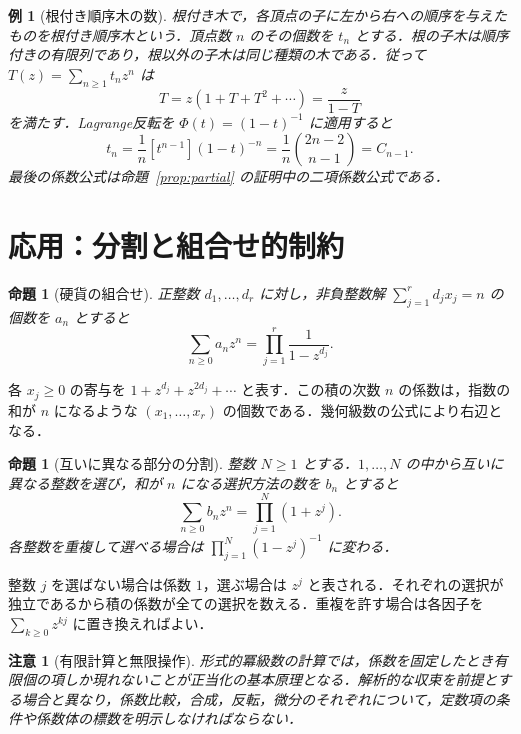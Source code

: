 \documentclass[a5paper,10pt,onecolumn]{jsarticle}
\makeatletter
\theoremstyle{mathnotetheorem}
\newtheorem{proposition}[theorem]{命題}
\newtheorem{example}[theorem]{例}
\newtheorem{remark}[theorem]{注意}
\renewcommand{\proofname}{証明}
\renewenvironment{proof}[1][\proofname]{%
  \par\pushQED{\qed}\normalfont\topsep4\p@\@plus2\p@\relax
  \trivlist\item[\hskip\labelsep\bfseries #1]\ignorespaces
}{\popQED\endtrivlist\@endpefalse}
\makeatother
\begin{document}
\begin{example}[根付き順序木の数]
根付き木で，各頂点の子に左から右への順序を与えたものを根付き順序木という．頂点数 $n$ のその個数を $t_n$ とする．根の子木は順序付きの有限列であり，根以外の子木は同じ種類の木である．従って $T(z)=\sum_{n\ge1}t_nz^n$ は
\[
 T=z(1+T+T^2+\cdots)=\frac{z}{1-T}
\]
を満たす．Lagrange反転を $\Phi(t)=(1-t)^{-1}$ に適用すると
\[
 t_n=\frac1n[t^{n-1}](1-t)^{-n}
 =\frac1n\binom{2n-2}{n-1}=C_{n-1}.
\]
最後の係数公式は命題~\ref{prop:partial} の証明中の二項係数公式である．
\end{example}

\section{応用：分割と組合せ的制約}
\begin{proposition}[硬貨の組合せ]
正整数 $d_1,\dots,d_r$ に対し，非負整数解
$\sum_{j=1}^r d_jx_j=n$ の個数を $a_n$ とすると
\[
 \sum_{n\ge0}a_nz^n=\prod_{j=1}^r\frac1{1-z^{d_j}}.
\]
\end{proposition}
\begin{proof}
各 $x_j\ge0$ の寄与を $1+z^{d_j}+z^{2d_j}+\cdots$ と表す．この積の次数 $n$ の係数は，指数の和が $n$ になるような $(x_1,\dots,x_r)$ の個数である．幾何級数の公式により右辺となる．
\end{proof}

\begin{proposition}[互いに異なる部分の分割]
整数 $N\ge1$ とする．$1,\dots,N$ の中から互いに異なる整数を選び，和が $n$ になる選択方法の数を $b_n$ とすると
\[
 \sum_{n\ge0}b_nz^n=\prod_{j=1}^N(1+z^j).
\]
各整数を重複して選べる場合は $\prod_{j=1}^N(1-z^j)^{-1}$ に変わる．
\end{proposition}
\begin{proof}
整数 $j$ を選ばない場合は係数 $1$，選ぶ場合は $z^j$ と表される．それぞれの選択が独立であるから積の係数が全ての選択を数える．重複を許す場合は各因子を $\sum_{k\ge0}z^{kj}$ に置き換えればよい．
\end{proof}

\begin{remark}[有限計算と無限操作]
形式的冪級数の計算では，係数を固定したとき有限個の項しか現れないことが正当化の基本原理となる．解析的な収束を前提とする場合と異なり，係数比較，合成，反転，微分のそれぞれについて，定数項の条件や係数体の標数を明示しなければならない．
\end{remark}
\end{document}
